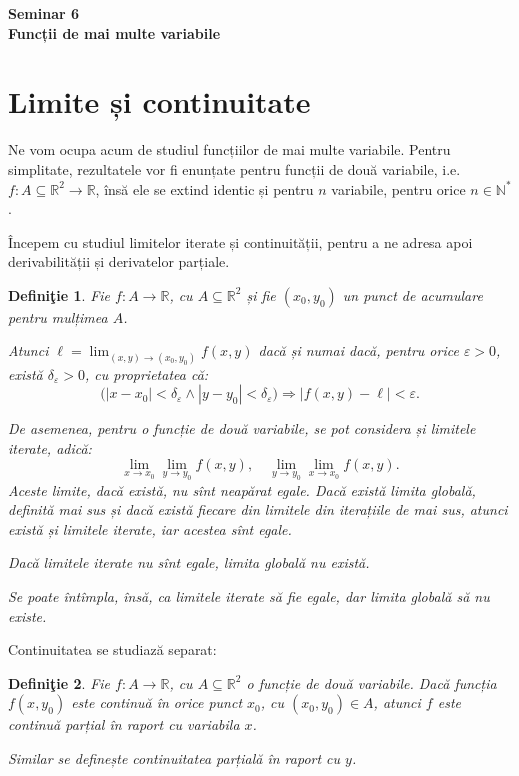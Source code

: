 \documentclass[11pt,a4paper]{article}
\newcommand\ds{\displaystyle}
\newcommand\seq{\subseteq}
\newcommand\NN{\mathbb{N}}
\newcommand\RR{\mathbb{R}}
\theoremstyle{dotless}
\theoremstyle{dotlessdr}
\newtheorem{definition}{Defini\c{t}ie}[section]
\begin{document}
\begin{center}
  {\large\textbf{Seminar 6 \\ Funcții de mai multe variabile}}
\end{center}

\vspace{1cm}

\section{Limite și continuitate}
\label{sec:limite-cont}

Ne vom ocupa acum de studiul funcțiilor de mai multe variabile. Pentru simplitate,
rezultatele vor fi enunțate pentru funcții de două variabile, i.e.\
$f : A \seq \RR^2 \to \RR$, însă ele se extind identic și pentru $n$ variabile, pentru
orice $n \in \NN^\ast$.

Începem cu studiul limitelor iterate și continuității, pentru a ne adresa apoi
derivabilității și derivatelor parțiale.

\begin{definition}\label{def:lim-iter}
  Fie $f : A \to \RR$, cu $A \seq \RR^2$ și fie $(x_0, y_0)$ un punct de acumulare pentru
  mulțimea $A$.

  Atunci $\ell = \ds\lim_{(x, y) \to (x_0, y_0)} f(x, y)$ dacă și numai dacă, pentru orice
  $\varepsilon > 0$, există $\delta_\varepsilon > 0$, cu proprietatea că:
  \[
    \big( |x - x_0| < \delta_\varepsilon \land | y - y_0 | < \delta_\varepsilon \big) \Rightarrow %
    |f (x, y) - \ell | < \varepsilon.
  \]

  De asemenea, pentru o funcție de două variabile, se pot considera și \emph{limitele iterate},
  adică:
  \[
    \lim_{x \to x_0} \lim_{y \to y_0} f(x, y), \quad %
    \lim_{y \to y_0} \lim_{x \to x_0} f(x, y).
  \]
  Aceste limite, dacă există, nu sînt neapărat egale. Dacă există \emph{limita globală}, definită
  mai sus și dacă există fiecare din limitele din iterațiile de mai sus, atunci există și
  limitele iterate, iar acestea sînt egale.

  Dacă limitele iterate nu sînt egale, limita globală nu există.

  Se poate întîmpla, însă, ca limitele iterate să fie egale, dar limita globală să nu existe.
\end{definition}

Continuitatea se studiază separat:

\begin{definition}\label{def:cont-mm}
  Fie $f : A \to \RR$, cu $A \seq \RR^2$ o funcție de două variabile. Dacă funcția $f(x, y_0)$
  este continuă în orice punct $x_0$, cu $(x_0, y_0) \in A$, atunci $f$ este \emph{continuă parțial}
  în raport cu variabila $x$.

  Similar se definește continuitatea parțială în raport cu $y$.
\end{definition}
\end{document}
